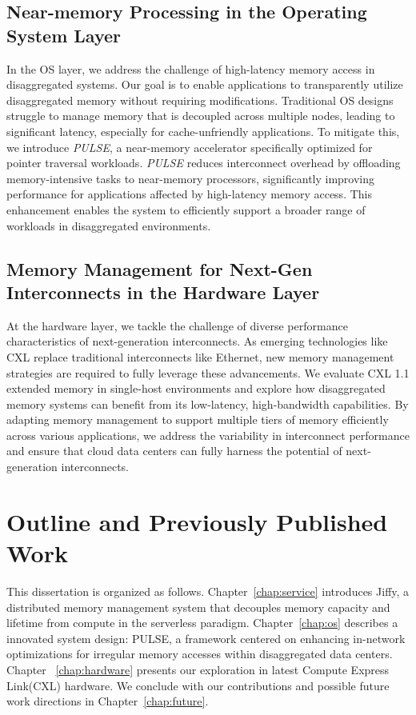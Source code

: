 \subsection{Near-memory Processing in the Operating System Layer}

In the OS layer, we address the challenge of high-latency memory access in disaggregated systems. Our goal is to enable applications to transparently utilize disaggregated memory without requiring modifications. Traditional OS designs struggle to manage memory that is decoupled across multiple nodes, leading to significant latency, especially for cache-unfriendly applications. To mitigate this, we introduce \textit{PULSE}, a near-memory accelerator specifically optimized for pointer traversal workloads. \textit{PULSE} reduces interconnect overhead by offloading memory-intensive tasks to near-memory processors, significantly improving performance for applications affected by high-latency memory access. This enhancement enables the system to efficiently support a broader range of workloads in disaggregated environments.

\subsection{Memory Management for Next-Gen Interconnects in the Hardware Layer}

At the hardware layer, we tackle the challenge of diverse performance characteristics of next-generation interconnects. As emerging technologies like CXL replace traditional interconnects like Ethernet, new memory management strategies are required to fully leverage these advancements. We evaluate CXL 1.1 extended memory in single-host environments and explore how disaggregated memory systems can benefit from its low-latency, high-bandwidth capabilities. By adapting memory management to support multiple tiers of memory efficiently across various applications, we address the variability in interconnect performance and ensure that cloud data centers can fully harness the potential of next-generation interconnects.

\section{Outline and Previously Published Work}

This dissertation is organized as follows. Chapter~\ref{chap:service} introduces Jiffy, a distributed memory management system that decouples memory capacity and lifetime from compute in the serverless paradigm. Chapter~\ref{chap:os} describes a innovated system design: PULSE, a framework centered on enhancing in-network optimizations for irregular memory accesses within disaggregated data centers. Chapter ~\ref{chap:hardware} presents our exploration in latest Compute Express Link(CXL) hardware. We conclude with our contributions and possible future work directions in Chapter~\ref{chap:future}.

